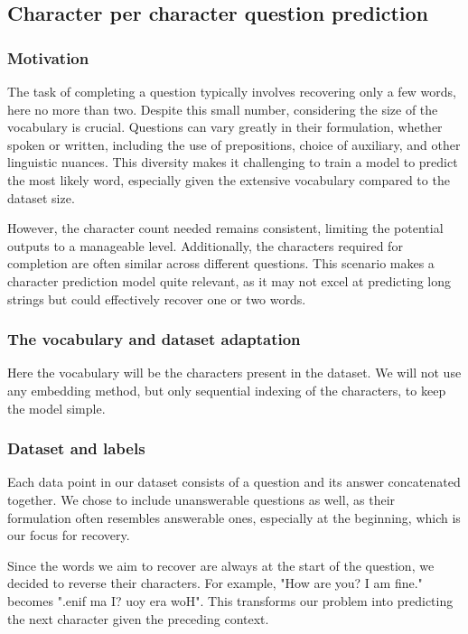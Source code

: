 \documentclass{article}
\begin{document}
\subsection{Character per character question prediction}

\subsubsection{Motivation}
The task of completing a question typically involves recovering only a few words, here no more than two. Despite this small number, considering the size of the vocabulary is crucial. Questions can vary greatly in their formulation, whether spoken or written, including the use of prepositions, choice of auxiliary, and other linguistic nuances. This diversity makes it challenging to train a model to predict the most likely word, especially given the extensive vocabulary compared to the dataset size.

However, the character count needed remains consistent, limiting the potential outputs to a manageable level. Additionally, the characters required for completion are often similar across different questions. This scenario makes a character prediction model quite relevant, as it may not excel at predicting long strings but could effectively recover one or two words.

\subsubsection{The vocabulary and dataset adaptation}
Here the vocabulary will be the characters present in the dataset. We will not use any embedding method, but only sequential indexing of the characters, to keep the model simple.

\subsubsection{Dataset and labels}
Each data point in our dataset consists of a question and its answer concatenated together. We chose to include unanswerable questions as well, as their formulation often resembles answerable ones, especially at the beginning, which is our focus for recovery.

Since the words we aim to recover are always at the start of the question, we decided to reverse their characters. For example, "How are you? I am fine." becomes ".enif ma I? uoy era woH". This transforms our problem into predicting the next character given the preceding context.
\end{document}
